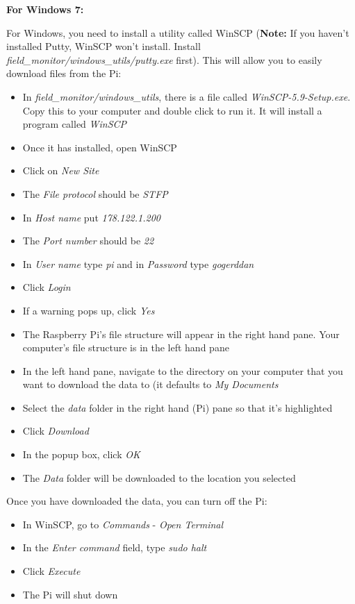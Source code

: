 \documentclass[10pt]{article}
\begin{document}
\textbf{For Windows 7:} \newline

For Windows, you need to install a utility called WinSCP (\textbf{Note:} If you haven't installed Putty, WinSCP won't install. Install \textit{field\_monitor/windows\_utils/putty.exe} first). This will allow you to easily download files from the Pi:

\begin{itemize}
 \item In \textit{field\_monitor/windows\_utils}, there is a file called \textit{WinSCP-5.9-Setup.exe}. Copy this to your computer and double click to run it. It will install a program called \textit{WinSCP}
 \item Once it has installed, open WinSCP
 \item Click on \textit{New Site}
 \item The \textit{File protocol} should be \textit{STFP}
 \item In \textit{Host name} put \textit{178.122.1.200}
 \item The \textit{Port number} should be \textit{22}
 \item In \textit{User name} type \textit{pi} and in \textit{Password} type \textit{gogerddan}
 \item Click \textit{Login}
 \item If a warning pops up, click \textit{Yes}
 \item The Raspberry Pi's file structure will appear in the right hand pane. Your computer's file structure is in the left hand pane
 \item In the left hand pane, navigate to the directory on your computer that you want to download the data to (it defaults to \textit{My Documents}
 \item Select the \textit{data} folder in the right hand (Pi) pane so that it's highlighted
 \item Click \textit{Download} 
 \item In the popup box, click \textit{OK}
 \item The \textit{Data} folder will be downloaded to the location you selected
\end{itemize}

Once you have downloaded the data, you can turn off the Pi:

\begin{itemize}
 \item In WinSCP, go to \textit{Commands} - \textit{Open Terminal}
 \item In the \textit{Enter command} field, type \textit{sudo halt}
 \item Click \textit{Execute}
 \item The Pi will shut down
\end{itemize}
\end{document}
